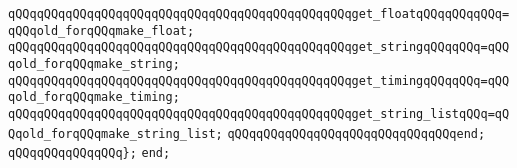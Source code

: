 \verb|qQQqqQQqqQQqqQQqqQQqqQQqqQQqqQQqqQQqqQQqqQQqqQQqget_floatqQQqqQQqqQQq=qQQqold_forqQQqmake_float;|\newline
\verb|qQQqqQQqqQQqqQQqqQQqqQQqqQQqqQQqqQQqqQQqqQQqqQQqget_stringqQQqqQQq=qQQqold_forqQQqmake_string;|\newline
\verb|qQQqqQQqqQQqqQQqqQQqqQQqqQQqqQQqqQQqqQQqqQQqqQQqget_timingqQQqqQQq=qQQqold_forqQQqmake_timing;|\newline
\newline
\verb|qQQqqQQqqQQqqQQqqQQqqQQqqQQqqQQqqQQqqQQqqQQqqQQqget_string_listqQQq=qQQqold_forqQQqmake_string_list;|\newline
\verb|qQQqqQQqqQQqqQQqqQQqqQQqqQQqqQQqend;|\newline
\verb|qQQqqQQqqQQqqQQq};|\newline
\verb|end;|\newline
\newline

